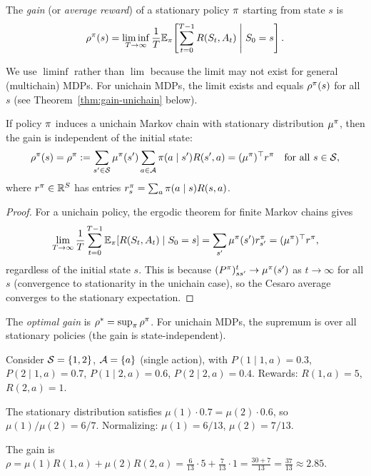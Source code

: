 \documentclass[11pt,a4paper]{article}
\begin{document}
\begin{definition}
\label{def:gain}
The \emph{gain} (or \emph{average reward}) of a stationary policy
$\pi$ starting from state $s$ is
\[
    \rho^\pi(s) = \liminf_{T \to \infty}
    \frac{1}{T} \mathbb{E}_\pi\!\left[
    \sum_{t=0}^{T-1} R(S_t, A_t) \;\middle|\; S_0 = s \right].
\]
\end{definition}

\begin{remark}
\label{rem:liminf}
We use $\liminf$ rather than $\lim$ because the limit may not exist
for general (multichain) MDPs. For unichain MDPs, the limit exists
and equals $\rho^\pi(s)$ for all $s$ (see
Theorem~\ref{thm:gain-unichain} below).
\end{remark}

\begin{theorem}
\label{thm:gain-unichain}
If policy $\pi$ induces a unichain Markov chain with stationary
distribution $\mu^\pi$, then the gain is independent of the
initial state:
\[
    \rho^\pi(s) = \rho^\pi
    := \sum_{s' \in \mathcal{S}} \mu^\pi(s')
    \sum_{a \in \mathcal{A}} \pi(a \mid s') R(s', a)
    = (\mu^\pi)^\top r^\pi
    \quad \text{for all } s \in \mathcal{S},
\]
where $r^\pi \in \mathbb{R}^S$ has entries
$r^\pi_s = \sum_a \pi(a \mid s) R(s,a)$.
\end{theorem}

\begin{proof}
For a unichain policy, the ergodic theorem for finite Markov chains
gives
\[
    \lim_{T \to \infty} \frac{1}{T} \sum_{t=0}^{T-1}
    \mathbb{E}_\pi[R(S_t, A_t) \mid S_0 = s]
    = \sum_{s'} \mu^\pi(s') r^\pi_{s'}
    = (\mu^\pi)^\top r^\pi,
\]
regardless of the initial state $s$. This is because
$(P^\pi)^t_{ss'} \to \mu^\pi(s')$ as $t \to \infty$ for
all $s$ (convergence to stationarity in the unichain case), so the
Cesaro average converges to the stationary expectation.
\end{proof}

\begin{definition}
\label{def:optimal-gain}
The \emph{optimal gain} is
$\rho^* = \sup_{\pi} \rho^\pi$. For unichain MDPs, the
supremum is over all stationary policies (the gain is
state-independent).
\end{definition}

\begin{example}
\label{ex:avg-simple}
Consider $\mathcal{S} = \{1, 2\}$, $\mathcal{A} = \{a\}$ (single action),
with $P(1 \mid 1, a) = 0.3$, $P(2 \mid 1, a) = 0.7$,
$P(1 \mid 2, a) = 0.6$, $P(2 \mid 2, a) = 0.4$. Rewards:
$R(1, a) = 5$, $R(2, a) = 1$.

The stationary distribution satisfies $\mu(1) \cdot 0.7 =
\mu(2) \cdot 0.6$, so $\mu(1)/\mu(2) = 6/7$. Normalizing:
$\mu(1) = 6/13$, $\mu(2) = 7/13$.

The gain is $\rho = \mu(1) R(1,a) + \mu(2) R(2,a) =
\frac{6}{13} \cdot 5 + \frac{7}{13} \cdot 1 =
\frac{30 + 7}{13} = \frac{37}{13} \approx 2.85$.
\end{example}
\end{document}
